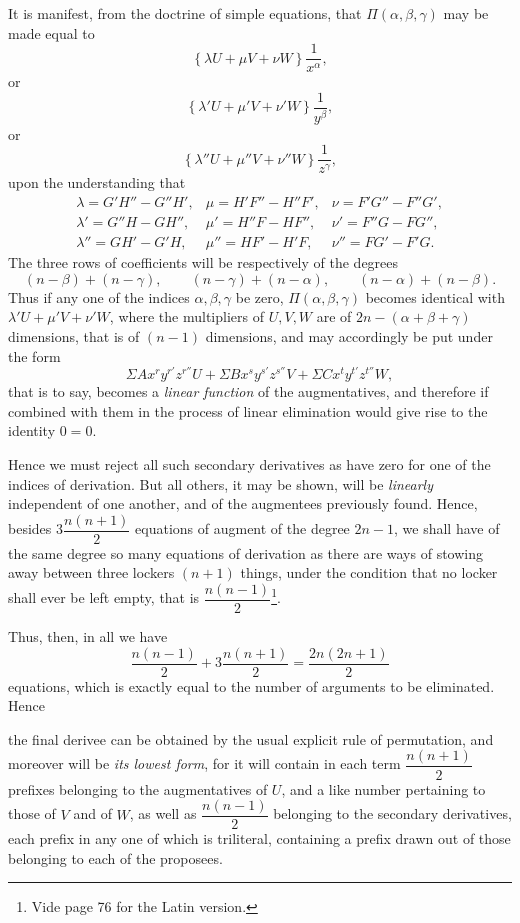 \documentclass[11pt]{article}
\newcommand{\sourcepage}[1]{\marginpar{\scriptsize p.~#1}}
\begin{document}
It is manifest, from the doctrine of simple equations, that $\Pi(\alpha,\beta,\gamma)$ may be made equal to
\[
 \left\{\lambda U+\mu V+\nu W\right\}\frac{1}{x^\alpha},
\]
or
\[
 \left\{\lambda' U+\mu' V+\nu' W\right\}\frac{1}{y^\beta},
\]
or
\[
 \left\{\lambda'' U+\mu'' V+\nu'' W\right\}\frac{1}{z^\gamma},
\]
upon the understanding that
\[
\begin{array}{lll}
 \lambda=G'H''-G''H',& \mu=H'F''-H''F',& \nu=F'G''-F''G',\\[0.25em]
 \lambda'=G''H-GH'',& \mu'=H''F-HF'',& \nu'=F''G-FG'',\\[0.25em]
 \lambda''=GH'-G'H,& \mu''=HF'-H'F,& \nu''=FG'-F'G.
\end{array}
\]
The three rows of coefficients will be respectively of the degrees
\[
 (n-\beta)+(n-\gamma),\qquad (n-\gamma)+(n-\alpha),\qquad (n-\alpha)+(n-\beta).
\]
Thus if any one of the indices $\alpha,\beta,\gamma$ be zero, $\Pi(\alpha,\beta,\gamma)$ becomes identical with $\lambda' U+\mu' V+\nu' W$, where the multipliers of $U,V,W$ are of $2n-(\alpha+\beta+\gamma)$ dimensions, that is of $(n-1)$ dimensions, and may accordingly be put under the form
\[
 \Sigma A x^r y^{r'}z^{r''}U+
 \Sigma B x^s y^{s'}z^{s''}V+
 \Sigma C x^t y^{t'}z^{t''}W,
\]
that is to say, becomes a \emph{linear function} of the augmentatives, and therefore if combined with them in the process of linear elimination would give rise to the identity $0=0$.

Hence we must reject all such secondary derivatives as have zero for one of the indices of derivation. But all others, it may be shown, will be \emph{linearly} independent of one another, and of the augmentees previously found. Hence, besides $3\dfrac{n(n+1)}{2}$ equations of augment of the degree $2n-1$, we shall have of the same degree so many equations of derivation as there are ways of stowing away between three lockers $(n+1)$ things, under the condition that no locker shall ever be left empty, that is $\dfrac{n(n-1)}{2}$\footnote{Vide page 76 for the Latin version.}.

Thus, then, in all we have
\[
 \frac{n(n-1)}{2}+3\frac{n(n+1)}{2}=\frac{2n(2n+1)}{2}
\]
equations, which is exactly equal to the number of arguments to be eliminated. Hence

\sourcepage{79}
the final derivee can be obtained by the usual explicit rule of permutation, and moreover will be \emph{its lowest form}, for it will contain in each term $\dfrac{n(n+1)}{2}$ prefixes belonging to the augmentatives of $U$, and a like number pertaining to those of $V$ and of $W$, as well as $\dfrac{n(n-1)}{2}$ belonging to the secondary derivatives, each prefix in any one of which is triliteral, containing a prefix drawn out of those belonging to each of the proposees.
\end{document}
